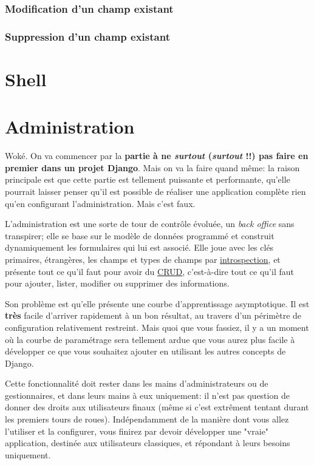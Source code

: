 \documentclass[11pt]{amsbook}
\begin{document}
\hypertarget{x-modification-d’un-champ-existant}{\subsection{Modification d’un champ existant}}

\hypertarget{x-suppression-d’un-champ-existant}{\subsection{Suppression d’un champ existant}}

\hypertarget{x-shell}{\chapter{Shell}}

\hypertarget{x-administration}{\chapter{Administration}}
Woké. On va commencer par la \textbf{partie à ne \emph{surtout} (\emph{surtout} !!) pas faire en premier dans un projet Django}.
Mais on va la faire quand même: la raison principale est que cette partie est tellement puissante et performante, qu’elle pourrait laisser penser qu’il est possible de réaliser une application complète rien qu’en configurant l’administration.
Mais c’est faux.


L’administration est une sorte de tour de contrôle évoluée, un \emph{back office} sans transpirer; elle se base sur le modèle de données programmé et construit dynamiquement les formulaires qui lui est associé.
Elle joue avec les clés primaires, étrangères, les champs et types de champs par \href{https://fr.wikipedia.org/wiki/Introspection}{introspection}, et présente tout ce qu’il faut pour avoir du \href{https://fr.wikipedia.org/wiki/CRUD}{CRUD}, c’est-à-dire tout ce qu’il faut pour ajouter, lister, modifier ou supprimer des informations.


Son problème est qu’elle présente une courbe d’apprentissage asymptotique.
Il est \textbf{très} facile d’arriver rapidement à un bon résultat, au travers d’un périmètre de configuration relativement restreint.
Mais quoi que vous fassiez, il y a un moment où la courbe de paramétrage sera tellement ardue que vous aurez plus facile à développer ce que vous souhaitez ajouter en utilisant les autres concepts de Django.


Cette fonctionnalité doit rester dans les mains d’administrateurs ou de gestionnaires, et dans leurs mains à eux uniquement: il n’est pas question de donner des droits aux utilisateurs finaux (même si c’est extrêment tentant durant les premiers tours de roues).
Indépendamment de la manière dont vous allez l’utiliser et la configurer, vous finirez par devoir développer une "vraie" application, destinée aux utilisateurs classiques, et répondant à leurs besoins uniquement.
\end{document}
